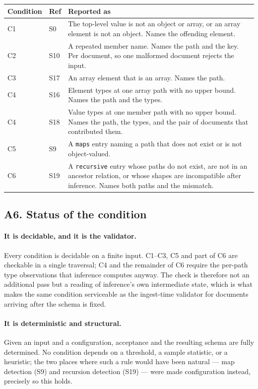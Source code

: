 \begin{center}
\begin{tabular}{@{}llp{6.1cm}@{}}
\hline
\textbf{Condition} & \textbf{Ref} & \textbf{Reported as} \\
\hline
C1 & S0  & The top-level value is not an object or array, or an array element
            is not an object. Names the offending element. \\
C2 & S10 & A repeated member name. Names the path and the key. Per document,
            so one malformed document rejects the input. \\
C3 & S17 & An array element that is an array. Names the path. \\
C4 & S16 & Element types at one array path with no upper bound. Names the path
            and the types. \\
C4 & S18 & Value types at one member path with no upper bound. Names the path,
            the types, and the pair of documents that contributed them. \\
C5 & S9  & A \texttt{maps} entry naming a path that does not exist or is not
            object-valued. \\
C6 & S19 & A \texttt{recursive} entry whose paths do not exist, are not in an
            ancestor relation, or whose shapes are incompatible after
            inference. Names both paths and the mismatch. \\
\hline
\end{tabular}
\end{center}

\subsection*{A6. Status of the condition}

\paragraph{It is decidable, and it is the validator.}
Every condition is decidable on a finite input. C1--C3, C5 and part of C6 are
checkable in a single traversal; C4 and the remainder of C6 require the
per-path type observations that inference computes anyway. The check is
therefore not an additional pass but a reading of inference's own
intermediate state, which is what makes the same condition serviceable as the
ingest-time validator for documents arriving after the schema is fixed.

\paragraph{It is deterministic and structural.}
Given an input and a configuration, acceptance and the resulting schema are
fully determined. No condition depends on a threshold, a sample statistic, or a
heuristic; the two places where such a rule would have been natural --- map
detection (S9) and recursion detection (S19) --- were made configuration
instead, precisely so this holds.

